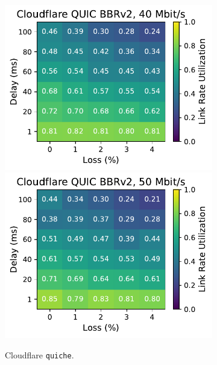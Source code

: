 \begin{figure}[ht]
\begin{subfigure}[b]{0.22\linewidth}
        \includegraphics[width=\linewidth,trim={0 0 2cm 0},clip]{splitting/figures/heatmaps/heatmap_quiche_bbr2_40mbps.pdf}
        \includegraphics[width=\linewidth,trim={0 0 2cm 0},clip]{splitting/figures/heatmaps/heatmap_quiche_bbr2_50mbps.pdf}
        \caption{Cloudflare \texttt{quiche}.}
    \end{subfigure}
    \begin{subfigure}[b]{0.89cm}

\end{subfigure}
\end{figure}
